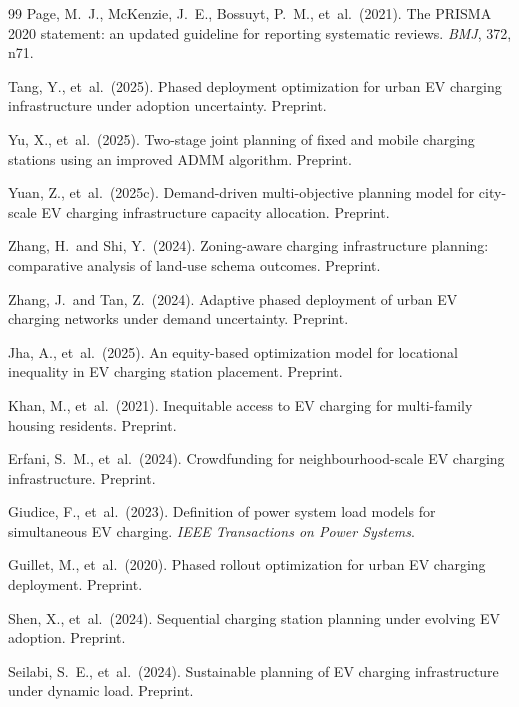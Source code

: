 \documentclass[12pt,letterpaper]{article}
\begin{document}
\begin{thebibliography}{99}
Page, M.\ J., McKenzie, J.\ E., Bossuyt, P.\ M., et~al.\ (2021).
The PRISMA 2020 statement: an updated guideline for reporting systematic reviews.
\textit{BMJ}, 372, n71.

Tang, Y., et~al.\ (2025).
Phased deployment optimization for urban EV charging infrastructure under
  adoption uncertainty.
Preprint.

Yu, X., et~al.\ (2025).
Two-stage joint planning of fixed and mobile charging stations using an improved
  ADMM algorithm.
Preprint.

Yuan, Z., et~al.\ (2025c).
Demand-driven multi-objective planning model for city-scale EV charging
  infrastructure capacity allocation.
Preprint.

Zhang, H.\ and Shi, Y.\ (2024).
Zoning-aware charging infrastructure planning: comparative analysis of
  land-use schema outcomes.
Preprint.

Zhang, J.\ and Tan, Z.\ (2024).
Adaptive phased deployment of urban EV charging networks under demand
  uncertainty.
Preprint.

Jha, A., et~al.\ (2025).
An equity-based optimization model for locational inequality in EV
  charging station placement.
Preprint.

Khan, M., et~al.\ (2021).
Inequitable access to EV charging for multi-family housing residents.
Preprint.

Erfani, S.\ M., et~al.\ (2024).
Crowdfunding for neighbourhood-scale EV charging infrastructure.
Preprint.

Giudice, F., et~al.\ (2023).
Definition of power system load models for simultaneous EV charging.
\textit{IEEE Transactions on Power Systems}.

Guillet, M., et~al.\ (2020).
Phased rollout optimization for urban EV charging deployment.
Preprint.

Shen, X., et~al.\ (2024).
Sequential charging station planning under evolving EV adoption.
Preprint.

Seilabi, S.\ E., et~al.\ (2024).
Sustainable planning of EV charging infrastructure under dynamic load.
Preprint.


\end{thebibliography}
\end{document}
